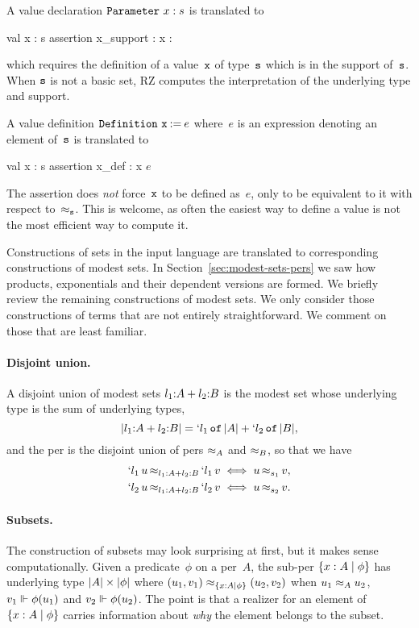 A value declaration $\iParameter{x}{s}$ is translated to
%
\begin{source}
val x : s
assertion x_support : x : 
\end{source}
%
which requires the definition of a value~$\f{x}$ of type~$\f{s}$ which is in
the support of~$\f{s}$.
\iflong
When $\f{s}$ is not a basic set, RZ computes the
interpretation of the underlying type and support.
\fi

A value definition $\iDefinition{\f{x}}{e}$ where~$e$ is an expression
denoting an element of~$\f{s}$ is translated to
%
\newcommand{\iE}{$e$}
\begin{source}
val x : s
assertion x_def : x  \iE
\end{source}
%
The assertion does \emph{not} force~$\f{x}$ to be defined as~$e$, only
to be equivalent to it with respect to~$\per_{\f{s}}$. This is
welcome, as often the easiest way to define a value is not the most
efficient way to compute it.

Constructions of sets in the input language are translated to
corresponding constructions of modest sets.
%
\iflong
In Section~\ref{sec:modest-sets-pers} we saw how products,
exponentials and their dependent versions are formed. We briefly
review the remaining constructions of modest sets. We only consider
those constructions of terms that are not entirely straightforward.
%
\else
%
We comment on those that are least familiar.
%
\fi

\iflong
\paragraph{Disjoint union.}
%
A disjoint union of modest sets $\isum{\il_1}{A}{\il_2}{B}$ is the
modest set whose underlying type is the sum of underlying types,
%
\begin{equation*}
  \typeOf{\isum{\il_1}{A}{\il_2}{B}} =
  \osumtyx{\il_1}{\typeOf{A}}{\il_2}{\typeOf{B}},
\end{equation*}
%
and the per is the disjoint union of pers $\per_{A}$ and $\per_{B}$, so
that we have
%
\begin{align*}
  \oper{\isum{\il_1}{A}{\il_2}{B}}{\oinj{\il_1}{u}}{\oinj{\il_1}{v}}
  &\iff \oper{s_1}{u}{v},
  \\
  \oper{\isum{\il_1}{A}{\il_2}{B}}{\oinj{\il_2}{u}}{\oinj{\il_2}{v}}
  &\iff \oper{s_2}{u}{v}.
\end{align*}
\fi %

\paragraph{Subsets.}
%
\iflong
%
The construction of subsets may look surprising at first, but
it makes sense computationally.
\fi
Given a predicate~$\phi$ on a per~$A$, the sub-per $\set{x : A
  \such \phi}$ has underlying type $\typeOf{A} \times \typeOf{\phi}$
where $(u_1,v_1) \per_{\set{x : A \such \phi}} (u_2,v_2)$ when $u_1
\per_A u_2$, $v_1 \rz \phi(u_1)$ and $v_2 \rz \phi(u_2)$. The point is
that a realizer for an element of $\set{x : A
  \such \phi}$ carries information about \emph{why} the element
belongs to the subset.

